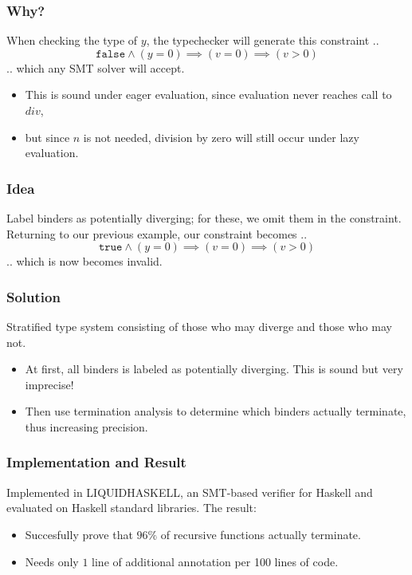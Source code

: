 \documentclass[pdf]{beamer}
\begin{document}
\begin{frame}
  \frametitle{Why?}
  When checking the type of $y$, the typechecker will generate this constraint ..
  $$\mathtt{false}\wedge(y=0)\implies(v=0)\implies(v>0)$$
  .. which any SMT solver will accept.
  \begin{itemize}
    \item This is sound under eager evaluation, since evaluation never reaches call to $div$,
    \item but since $n$ is not needed, division by zero will still occur under lazy evaluation.
  \end{itemize}
\end{frame}

\begin{frame}
  \frametitle{Idea}
  Label binders as potentially diverging; for these, we omit them in the
  constraint.  Returning to our previous example, our constraint becomes ..
  $$\mathtt{true}\wedge(y=0)\implies(v=0)\implies(v>0)$$
  .. which is now becomes invalid.
\end{frame}

\begin{frame}
  \frametitle{Solution}
  Stratified type system consisting of those who may diverge and those who may not.
  \begin{itemize}
    \item At first, all binders is labeled as potentially diverging.  This is
      sound but very imprecise!
    \item Then use termination analysis to determine which binders actually
      terminate, thus increasing precision.
  \end{itemize}
\end{frame}

\begin{frame}
  \frametitle{Implementation and Result}
  Implemented in LIQUIDHASKELL, an SMT-based verifier for Haskell and evaluated
  on Haskell standard libraries.  The result:
  \begin{itemize}
    \item Succesfully prove that $96\%$ of recursive functions actually terminate.
    \item Needs only $1$ line of additional annotation per 100 lines of code.
  \end{itemize}
\end{frame}
\end{document}
